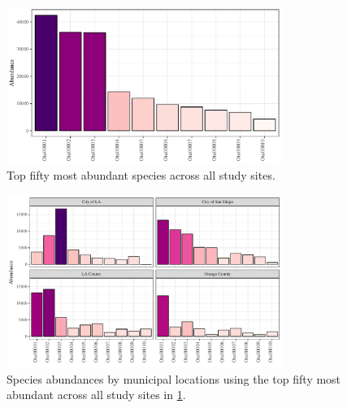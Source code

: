 \documentclass[letterpaper,12pt]{article}\usepackage[]{graphicx}\usepackage[]{color}
\newenvironment{knitrout}{}{} %
\begin{document}
\begin{knitrout}
\color{fgcolor}\begin{figure}[!ht]

{\centering \includegraphics[width=0.8\textwidth]{figs/abundall-1} 

}

\caption[Top fifty most abundant species across all study sites]{Top fifty most abundant species across all study sites.}\label{fig:abundall}
\end{figure}


\end{knitrout}

\begin{knitrout}
\color{fgcolor}\begin{figure}[!ht]

{\centering \includegraphics[width=0.8\textwidth]{figs/abundmuni-1} 

}

\caption{Species abundances by municipal locations using the top fifty most abundant across all study sites in \cref{fig:abundall}.}\label{fig:abundmuni}
\end{figure}


\end{knitrout}
\clearpage
\end{document}

